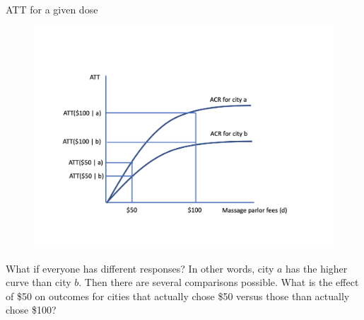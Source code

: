 \documentclass{beamer}
\begin{document}
\begin{frame}{ATT for a given dose}

\begin{figure}
\begin{center}
             \includegraphics[scale=0.3]{./lecture_includes/acrt_fig2.png}
\end{center}
\end{figure}

What if everyone has different responses?  In other words, city $a$ has the higher curve than city $b$.  Then there are several comparisons possible.  What is the effect of \$50 on outcomes for cities that actually chose \$50 versus those than actually chose \$100?  

\end{frame}
\end{document}
